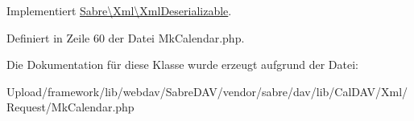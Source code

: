 Implementiert \mbox{\hyperlink{interface_sabre_1_1_xml_1_1_xml_deserializable_a19e0eca545b9a0d93f7d6b69085ade30}{Sabre\textbackslash{}\+Xml\textbackslash{}\+Xml\+Deserializable}}.



Definiert in Zeile 60 der Datei Mk\+Calendar.\+php.



Die Dokumentation für diese Klasse wurde erzeugt aufgrund der Datei\+:\begin{DoxyCompactItemize}
\item 
Upload/framework/lib/webdav/\+Sabre\+D\+A\+V/vendor/sabre/dav/lib/\+Cal\+D\+A\+V/\+Xml/\+Request/Mk\+Calendar.\+php\end{DoxyCompactItemize}
